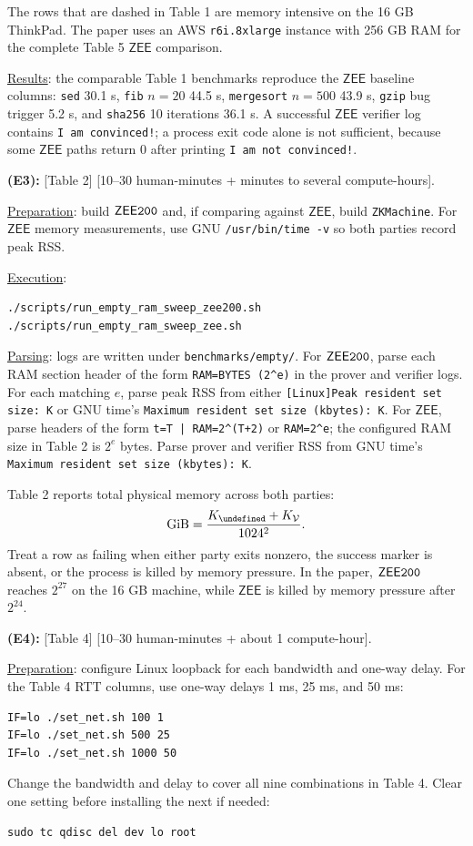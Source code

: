 \documentclass[nonacm,sigconf]{acmart}
\newcommand{\oursystem}{$\mathsf{ZEE}\tt{200}$\xspace}
\newcommand{\zee}[0]{\ensuremath{\mathsf{ZEE}}\xspace}
\let\P\undefined
\newcommand{\P}{\ensuremath{\mathcal{P}}\xspace}
\newcommand{\V}{\ensuremath{\mathcal{V}}\xspace}
\begin{document}
The rows that are dashed in Table 1 are memory intensive on the
16 GB ThinkPad. The paper uses an AWS \texttt{r6i.8xlarge} instance
with 256 GB RAM for the complete Table 5 \zee comparison.

\noindent
\underline{Results}: the comparable Table 1 benchmarks reproduce the
\zee baseline columns: \texttt{sed} 30.1 s, \texttt{fib}
$n=20$ 44.5 s, \texttt{mergesort} $n=500$ 43.9 s, \texttt{gzip} bug
trigger 5.2 s, and \texttt{sha256} 10 iterations 36.1 s. A successful
\zee verifier log contains \texttt{I am convinced!}; a process exit code
alone is not sufficient, because some \zee paths return 0 after printing
\texttt{I am not convinced!}.

\textbf{(E3):} [Table 2] [10--30 human-minutes + minutes to several
compute-hours].

\noindent
\underline{Preparation}: build \oursystem and, if comparing against
\zee, build \texttt{ZKMachine}. For \zee memory measurements, use GNU
\texttt{/usr/bin/time -v} so both parties record peak RSS.

\noindent
\underline{Execution}:
\begin{verbatim}
./scripts/run_empty_ram_sweep_zee200.sh
./scripts/run_empty_ram_sweep_zee.sh
\end{verbatim}

\noindent
\underline{Parsing}: logs are written under \texttt{benchmarks/empty/}.
For \oursystem, parse each RAM section header of the form
\texttt{RAM=BYTES (2\string^e)} in the prover and verifier logs. For
each matching $e$, parse peak RSS from either
\texttt{[Linux]Peak resident set size: K} or GNU time's
\texttt{Maximum resident set size (kbytes): K}. For \zee, parse headers
of the form \texttt{t=T | RAM=2\string^(T+2)} or
\texttt{RAM=2\string^e}; the configured RAM size in Table 2 is
$2^e$ bytes. Parse prover and verifier RSS from GNU time's
\texttt{Maximum resident set size (kbytes): K}.

Table 2 reports total physical memory across both parties:
\[
\mathrm{GiB} =
  \frac{K_{\P} + K_{\V}}{1024^2}.
\]
Treat a row as failing when either party exits nonzero, the success
marker is absent, or the process is killed by memory pressure. In the
paper, \oursystem reaches $2^{27}$ on the 16 GB machine, while \zee is
killed by memory pressure after $2^{24}$.

\textbf{(E4):} [Table 4] [10--30 human-minutes + about 1 compute-hour].

\noindent
\underline{Preparation}: configure Linux loopback for each bandwidth
and one-way delay. For the Table 4 RTT columns, use one-way delays 1 ms,
25 ms, and 50 ms:
\begin{verbatim}
IF=lo ./set_net.sh 100 1
IF=lo ./set_net.sh 500 25
IF=lo ./set_net.sh 1000 50
\end{verbatim}
Change the bandwidth and delay to cover all nine combinations in
Table 4. Clear one setting before installing the next if needed:
\begin{verbatim}
sudo tc qdisc del dev lo root
\end{verbatim}
\end{document}
